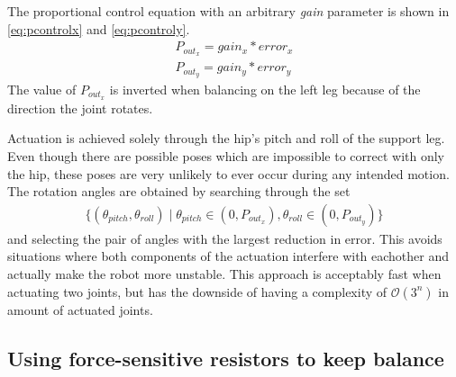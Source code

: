 \documentclass[a4paper]{article}
\begin{document}
The proportional control equation with an arbitrary \emph{gain} parameter is
shown in \ref{eq:pcontrolx} and \ref{eq:pcontroly}.
\begin{align}
  P_{out_{x}} = gain_x * error_x        \label{eq:pcontrolx} \\
  P_{out_{y}} = gain_y * error_y        \label{eq:pcontroly}
\end{align}
The value of $P_{out_{x}}$ is inverted when balancing on the left leg because of
the direction the joint rotates.

Actuation is achieved solely through the hip's pitch and roll of the support
leg. Even though there are possible poses which are impossible to correct with
only the hip, these poses are very unlikely to ever occur during any intended motion.
The rotation angles are obtained by searching through the set
\begin{align*}
  \{ (\theta_{pitch}, \theta_{roll}) \mid \theta_{pitch} \in (0, P_{out_{x}}),
  \theta_{roll} \in (0, P_{out_{y}}) \}
\end{align*}
and selecting the pair of angles with the largest reduction in error. This
avoids situations where both components of the actuation interfere with
eachother and actually make the robot more unstable. This approach is acceptably
fast when actuating two joints, but has the downside of having a complexity of
$\mathcal{O}(3^n)$ in amount of actuated joints.

\subsection{Using force-sensitive resistors to keep balance}
\end{document}
